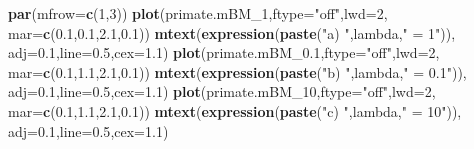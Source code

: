 \documentclass[fleqn,10pt,lineno]{wlpeerj} %
\newenvironment{Shaded}{\begin{snugshade}}{\end{snugshade}}
\newcommand{\AttributeTok}[1]{\textcolor[rgb]{0.13,0.29,0.53}{#1}}
\newcommand{\DecValTok}[1]{\textcolor[rgb]{0.00,0.00,0.81}{#1}}
\newcommand{\FloatTok}[1]{\textcolor[rgb]{0.00,0.00,0.81}{#1}}
\newcommand{\FunctionTok}[1]{\textcolor[rgb]{0.13,0.29,0.53}{\textbf{#1}}}
\newcommand{\NormalTok}[1]{#1}
\newcommand{\StringTok}[1]{\textcolor[rgb]{0.31,0.60,0.02}{#1}}
\begin{document}
\begin{Shaded}
\begin{Highlighting}[]
\FunctionTok{par}\NormalTok{(}\AttributeTok{mfrow=}\FunctionTok{c}\NormalTok{(}\DecValTok{1}\NormalTok{,}\DecValTok{3}\NormalTok{))}
\FunctionTok{plot}\NormalTok{(primate.mBM\_1,}\AttributeTok{ftype=}\StringTok{"off"}\NormalTok{,}\AttributeTok{lwd=}\DecValTok{2}\NormalTok{,}
  \AttributeTok{mar=}\FunctionTok{c}\NormalTok{(}\FloatTok{0.1}\NormalTok{,}\FloatTok{0.1}\NormalTok{,}\FloatTok{2.1}\NormalTok{,}\FloatTok{0.1}\NormalTok{))}
\FunctionTok{mtext}\NormalTok{(}\FunctionTok{expression}\NormalTok{(}\FunctionTok{paste}\NormalTok{(}\StringTok{"a) "}\NormalTok{,lambda,}\StringTok{" = 1"}\NormalTok{)),}
  \AttributeTok{adj=}\FloatTok{0.1}\NormalTok{,}\AttributeTok{line=}\FloatTok{0.5}\NormalTok{,}\AttributeTok{cex=}\FloatTok{1.1}\NormalTok{)}
\FunctionTok{plot}\NormalTok{(primate.mBM\_0}\FloatTok{.1}\NormalTok{,}\AttributeTok{ftype=}\StringTok{"off"}\NormalTok{,}\AttributeTok{lwd=}\DecValTok{2}\NormalTok{,}
  \AttributeTok{mar=}\FunctionTok{c}\NormalTok{(}\FloatTok{0.1}\NormalTok{,}\FloatTok{1.1}\NormalTok{,}\FloatTok{2.1}\NormalTok{,}\FloatTok{0.1}\NormalTok{))}
\FunctionTok{mtext}\NormalTok{(}\FunctionTok{expression}\NormalTok{(}\FunctionTok{paste}\NormalTok{(}\StringTok{"b) "}\NormalTok{,lambda,}\StringTok{" = 0.1"}\NormalTok{)),}
  \AttributeTok{adj=}\FloatTok{0.1}\NormalTok{,}\AttributeTok{line=}\FloatTok{0.5}\NormalTok{,}\AttributeTok{cex=}\FloatTok{1.1}\NormalTok{)}
\FunctionTok{plot}\NormalTok{(primate.mBM\_10,}\AttributeTok{ftype=}\StringTok{"off"}\NormalTok{,}\AttributeTok{lwd=}\DecValTok{2}\NormalTok{,}
  \AttributeTok{mar=}\FunctionTok{c}\NormalTok{(}\FloatTok{0.1}\NormalTok{,}\FloatTok{1.1}\NormalTok{,}\FloatTok{2.1}\NormalTok{,}\FloatTok{0.1}\NormalTok{))}
\FunctionTok{mtext}\NormalTok{(}\FunctionTok{expression}\NormalTok{(}\FunctionTok{paste}\NormalTok{(}\StringTok{"c) "}\NormalTok{,lambda,}\StringTok{" = 10"}\NormalTok{)),}
  \AttributeTok{adj=}\FloatTok{0.1}\NormalTok{,}\AttributeTok{line=}\FloatTok{0.5}\NormalTok{,}\AttributeTok{cex=}\FloatTok{1.1}\NormalTok{)}
\end{Highlighting}
\end{Shaded}
\end{document}
